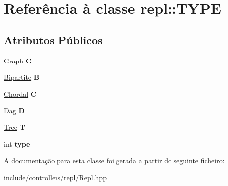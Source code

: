 \hypertarget{classrepl_1_1TYPE}{}\section{Referência à classe repl\+::T\+Y\+PE}
\label{classrepl_1_1TYPE}
\subsection*{Atributos Públicos}
\begin{DoxyCompactItemize}
\item 
\mbox{\label{classrepl_1_1TYPE_a013eb90de021a5709ad2f4358af2971a}} 
\mbox{\hyperlink{classGraph}{Graph}} {\bfseries G}
\item 
\mbox{\label{classrepl_1_1TYPE_a01b6b003a119f700450bb804ec14ef6f}} 
\mbox{\hyperlink{classBipartite}{Bipartite}} {\bfseries B}
\item 
\mbox{\label{classrepl_1_1TYPE_a3bc5eb2d3887f055fcbdc7f2c593ccc1}} 
\mbox{\hyperlink{classChordal}{Chordal}} {\bfseries C}
\item 
\mbox{\label{classrepl_1_1TYPE_aa4bf15ab3995316b8b8371416481d397}} 
\mbox{\hyperlink{classDag}{Dag}} {\bfseries D}
\item 
\mbox{\label{classrepl_1_1TYPE_aada2221dc1be384ec07e9e5728c8f0f7}} 
\mbox{\hyperlink{classTree}{Tree}} {\bfseries T}
\item 
\mbox{\label{classrepl_1_1TYPE_a8c09b0a470f429bbc82ab111f8202f5f}} 
int {\bfseries type}
\end{DoxyCompactItemize}


A documentação para esta classe foi gerada a partir do seguinte ficheiro\+:\begin{DoxyCompactItemize}
\item 
include/controllers/repl/\mbox{\hyperlink{Repl_8hpp}{Repl.\+hpp}}\end{DoxyCompactItemize}
